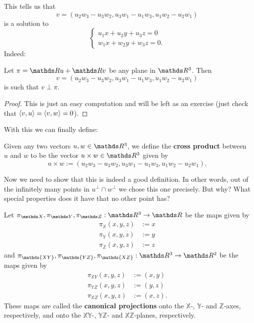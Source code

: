 This tells us that
\[v=(u_2w_3-u_3w_2,u_3w_1-u_1w_3,u_1w_2-u_2w_1)\]is a solution to
\[\begin{cases}
u_1x+u_2y+u_3z=0\\
w_1x+w_2y+w_3z=0.
\end{cases}\]Indeed:

\begin{lemma}
	Let $\pi=\R u+\R v$ be any plane in $\R^3$. Then $$v=(u_2w_3-u_3w_2,u_3w_1-u_1w_3,u_1w_2-u_2w_1)$$ is such that $v\perp \pi$.
\end{lemma}
\begin{proof}
	This is just an easy computation and will be left as an exercise (just check that $\langle v,u\rangle=\langle v,w\rangle=0$).
\end{proof}

With this we can finally define:

\begin{df}
	Given any two vectors $u,w\in \R^3$, we define the \textbf{cross product} between $u$ and $w$ to be the vector $u\times w\in \R^3$ given by
	\[u\times w:=(u_2w_3-u_3w_2,u_3w_1-u_1w_3,u_1w_2-u_2w_1).\]
\end{df}

Now we need to show that this is indeed a good definition. In other words, out of the infinitely many points in $u^\perp\cap w^\perp$ we chose this one precisely. But why? What special properties does it have that no other point has?

\begin{df}
	Let $\pi_{\mathds X},\pi_{\mathds Y},\pi_{\mathds Z}:\R^3\to \R$ be the maps given by 
	\begin{align*}
		\pi_{\mathds X}(x,y,z)&:=x\\
		\pi_{\mathds Y}(x,y,z)&:=y\\
		\pi_{\mathds Z}(x,y,z)&:=z
	\end{align*}and $\pi_{\mathds{ XY}},\pi_{\mathds {YZ}},\pi_{\mathds {XZ}}:\R^3\to \R^2$ be the maps given by
	\begin{align*}
	\pi_{\mathds XY}(x,y,z)&:=(x,y)\\
	\pi_{\mathds YZ}(x,y,z)&:=(y,z)\\
	\pi_{\mathds XZ}(x,y,z)&:=(x,z).
	\end{align*}These maps are called the \textbf{canonical projections} onto the $\mathds{X}$-, $\mathds{Y}$- and $\mathds{Z}$-axes, respectively, and onto the $\mathds{XY}$-, $\mathds{YZ}$- and $\mathds{XZ}$-planes, respectively.
\end{df}

